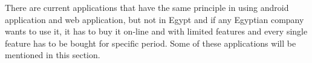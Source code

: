 There are current applications that have the same principle in using android application and web application, but not in Egypt and if any Egyptian company wants to use it, it has to buy it on-line and with limited features and every single feature has to be bought for specific period. Some of these applications will be mentioned in this section.